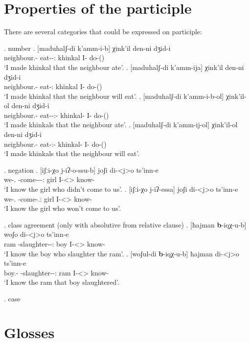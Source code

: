 \section{Properties of the participle}
There are several categories that could be expressed on participle:

\ex. number
	\ag. [maduhalʃ-di k'amm-i-b] χink'il den-ni dʒid-i\\
			{neighbour.\Obl-\Erg} {eat-\Pst-\Ptcp:\Pst} {khinkal}  {I-\Erg} {do-\Pst(\Aor)}\\
		 \glt    `I made khinkal that the neighbour ate'.
	\bg. [maduhalʃ-di k'amm-ija] χink'il den-ni dʒid-i\\
			{neighbour.\Obl-\Erg} {eat-\Ptcp:\Prae} {khinkal}  {I-\Erg} {do-\Pst(\Aor)}\\
		 \glt    `I made khinkal that the neighbour will eat'.	
	\bg. [maduhalʃ-di k'amm-i-b-ol] χink'il-ol den-ni dʒid-i\\
			{neighbour.\Obl-\Erg} {eat-\Pst-\Ptcp:\Pst-\Pl} {khinkal-\Pl}  {I-\Erg} {do-\Pst(\Aor)}\\
		 \glt    `I made khinkals that the neighbour ate'.
	\bg. [maduhalʃ-di k'amm-ij-ol] χink'il-ol den-ni dʒid-i\\
			{neighbour.\Obl-\Erg} {eat-\Ptcp:\Prae-\Pl} {khinkal-\Pl}  {I-\Erg} {do-\Pst(\Aor)}\\
		 \glt    `I made khinkals that the neighbour will eat'.	

\ex. negation
	\ag. [iʃːi-χo j-iʔ-o-ssu-b] joʃi di-<j>o ts'inn-e \\
		  {we-\Add.\Lat} {\F-come-\Pst-\Neg-\Ptcp:\Pst} {girl} {I-<\F>\Aff} {know-\Hab}\\
		 \glt    `I know the girl who didn't come to us'.
	\bg. [iʃːi-χo j-iʔ-essa] joʃi di-<j>o ts'inn-e \\
		  {we-\Add.\Lat} {\F-come-\Neg.\Ptcp:\Prae} {girl} {I-<\F>\Aff} {know-\Hab}\\
		 \glt    `I know the girl who won't come to us'.
		 
\ex. class agreement (only with absolutive from relative clause)
	\ag. [ħajman \textbf{b}-iqχ-u-b] woʃo di-<j>o ts'inn-e \\
			ram {\Nanf-slaughter-\Pst-\Ptcp:\Pst} boy {I-<\M>\Aff} {know-\Hab}\\
			\glt `I know the boy who slaughter the ram'.
	\bg. [woʃul-di \textbf{b}-iqχ-u-b] ħajman di-<j>o ts'inn-e \\
			{boy.\Obl-\Erg} {\Nanf-slaughter-\Pst-\Ptcp:\Pst} ram {I-<\M>\Aff} {know-\Hab}\\
			\glt `I know the ram that boy slaughtered'.	
			
\ex. case


\section*{Glosses}
\small
\printglosses


\normalsize
